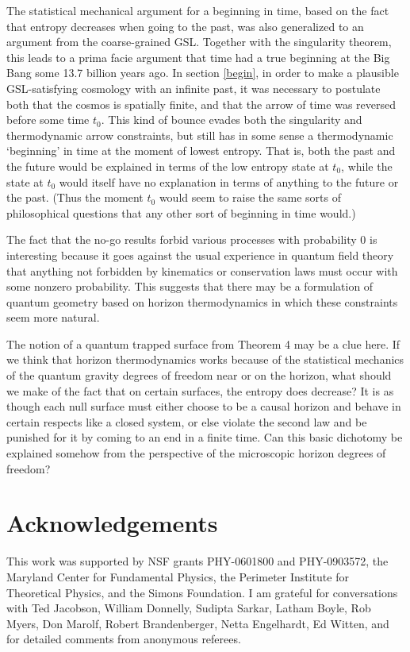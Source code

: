 \documentclass{article}
\begin{document}
The statistical mechanical argument for a beginning in time, based on the fact that entropy decreases when going to the past, was also generalized to an argument from the coarse-grained GSL.  Together with the singularity theorem, this leads to a prima facie argument that time had a true beginning at the Big Bang some 13.7 billion years ago.  In section \ref{begin}, in order to make a plausible GSL-satisfying cosmology with an infinite past, it was necessary to postulate both that the cosmos is spatially finite, and that the arrow of time was reversed before some time $t_0$.  This kind of bounce evades both the singularity and thermodynamic arrow constraints, but still has in some sense a thermodynamic `beginning' in time at the moment of lowest entropy.  That is, both the past and the future would be explained in terms of the low entropy state at $t_0$, while the state at $t_0$ would itself have no explanation in terms of anything to the future or the past.  (Thus the moment $t_0$ would seem to raise the same sorts of philosophical questions that any other sort of beginning in time would.)

The fact that the no-go results forbid various processes with probability 0 is interesting because it goes against the usual experience in quantum field theory that anything not forbidden by kinematics or conservation laws must occur with some nonzero probability.  This suggests that there may be a formulation of quantum geometry based on horizon thermodynamics in which these constraints seem more natural.

The notion of a quantum trapped surface from Theorem 4 may be a clue here.  If we think that horizon thermodynamics works because of the statistical mechanics of the quantum gravity degrees of freedom near or on the horizon, what should we make of the fact that on certain surfaces, the entropy does decrease?  It is as though each null surface must either choose to be a causal horizon and behave in certain respects like a closed system, or else violate the second law and be punished for it by coming to an end in a finite time.  Can this basic dichotomy be explained somehow from the perspective of the microscopic horizon degrees of freedom?

\section*{Acknowledgements}
\small
This work was supported by NSF grants PHY-0601800 and PHY-0903572, the Maryland Center for Fundamental Physics, the Perimeter Institute for Theoretical Physics, and the Simons Foundation.  I am grateful for conversations with Ted Jacobson, William Donnelly, Sudipta Sarkar, Latham Boyle, Rob Myers, Don Marolf, Robert Brandenberger, Netta Engelhardt, Ed Witten, and for detailed comments from anonymous referees.
\normalsize
\end{document}
